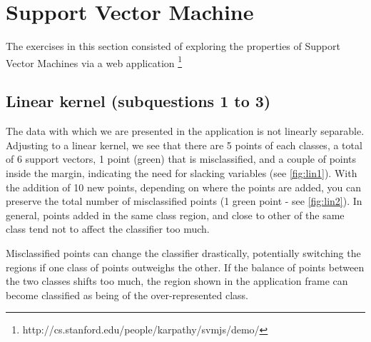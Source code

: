 \documentclass[11pt, a4paper]{article}
\begin{document}
\section{Support Vector Machine}

The exercises in this section consisted of exploring the properties of
Support Vector Machines via a web application
\footnote{http://cs.stanford.edu/people/karpathy/svmjs/demo/}

\subsection{Linear kernel (subquestions 1 to 3)}
The data with which we are presented in the application is not
linearly separable. Adjusting to a linear kernel, we see that there
are 5 points of each classes, a total of 6 support vectors, 1 point
(green) that is misclassified, and a couple of points inside the
margin, indicating the need for slacking variables (see
\ref{fig:lin1}). With the addition of 10 new points, depending on
where the points are added, you can preserve the total number of
misclassified points (1 green point - see \ref{fig:lin2}). In general,
points added in the same class region, and close to other of the same
class tend not to affect the classifier too much.

Misclassified points can change the classifier drastically,
potentially switching the regions if one class of points outweighs the
other. If the balance of points between the two classes shifts too
much, the region shown in the application frame can become classified
as being of the over-represented class.
\end{document}

